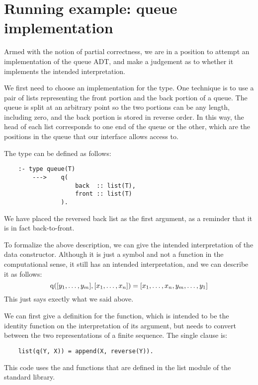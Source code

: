 \section{Running example: queue implementation}
\label{sec:queue-impl}

Armed with the notion of partial correctness,
we are in a position to attempt
an implementation of the queue ADT,
and make a judgement as to
whether it implements the intended interpretation.

We first need to choose an implementation for the  type.
One technique is to use a pair of lists
representing the front portion and the back portion of a queue.
The queue is split at an arbitrary point
so the two portions can be any length, including zero,
and the back portion is stored in reverse order.
In this way,
the head of each list corresponds to
one end of the queue or the other,
which are the positions in the queue
that our interface allows access to.

The type can be defined as follows:
\begin{verbatim}
    :- type queue(T)
        --->    q(
                    back  :: list(T),
                    front :: list(T)
                ).
\end{verbatim}
We have placed the reversed back list as the first argument,
as a reminder that it is in fact back-to-front.


To formalize the above description,
we can give the intended interpretation of the 
data constructor.
Although it is just a symbol
and not a function in the computational sense,
it still has an intended interpretation,
and we can describe it as follows:
\[
    \operatorname{q}([y_1, \ldots, y_m], [x_1, \ldots, x_n]) =
        [x_1, \ldots, x_n, y_m, \ldots, y_1]
\]
This just says exectly what we said above.

We can first give a definition for the  function,
which is intended to be the identity function
on the interpretation of its argument,
but needs to convert between the two representations
of a finite sequence.
The single clause is:
\begin{verbatim}
    list(q(Y, X)) = append(X, reverse(Y)).
\end{verbatim}
This code uses
the  and  functions
that are defined in the list module of the standard library.

